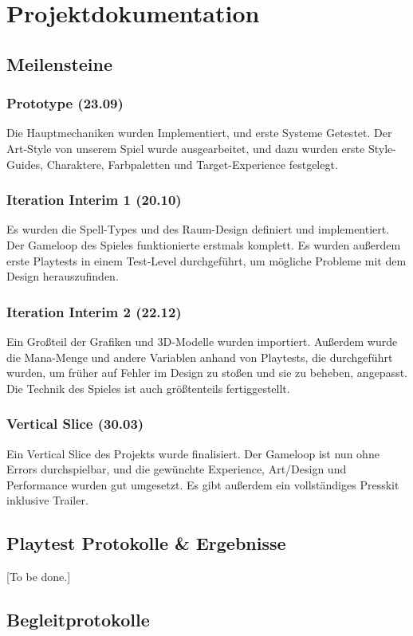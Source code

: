 \chapter{Projektdokumentation}

\section{Meilensteine}

\subsection{Prototype (23.09)}
Die Hauptmechaniken wurden Implementiert, und erste Systeme Getestet. Der Art-Style von unserem Spiel wurde ausgearbeitet, und dazu wurden erste Style-Guides, Charaktere, Farbpaletten und Target-Experience festgelegt.

\subsection{Iteration Interim 1 (20.10)}
Es wurden die Spell-Types und des Raum-Design definiert und implementiert. Der Gameloop des Spieles funktionierte erstmals komplett. Es wurden außerdem erste Playtests in einem Test-Level durchgeführt, um mögliche Probleme mit dem Design herauszufinden.

\subsection{Iteration Interim 2 (22.12)}
Ein Großteil der Grafiken und 3D-Modelle wurden importiert. Außerdem wurde die Mana-Menge und andere Variablen anhand von Playtests, die durchgeführt wurden, um früher auf Fehler im Design zu stoßen und sie zu beheben, angepasst. Die Technik des Spieles ist auch größtenteils fertiggestellt.

\subsection{Vertical Slice (30.03)}
Ein Vertical Slice des Projekts wurde finalisiert. Der Gameloop ist nun ohne Errors durchspielbar, und die gewünchte Experience, Art/Design und Performance wurden gut umgesetzt. Es gibt außerdem ein vollständiges Presskit inklusive Trailer.

\section{Playtest Protokolle \& Ergebnisse}
[To be done.]
%

\section{Begleitprotokolle}
%
